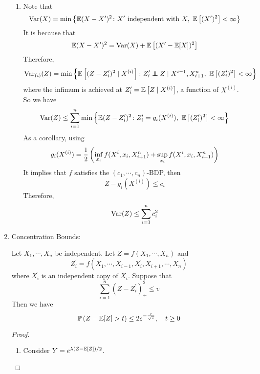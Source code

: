 \begin{enumerate}[label=\arabic{*}.]
\begin{enumerate}[label=(\roman*)]
		\item Note that
		\begin{equation*}
		    \operatorname{Var}(X) = \min \left\{\mathbb{E}(X-X^\prime)^2 \colon X^\prime \text{ independent with }X,~\mathbb{E}\left[(X^\prime)^2\right] < \infty\right\}
		\end{equation*}
		It is because that 
		\begin{equation*}
		    \mathbb{E}(X-X^\prime)^2 = \operatorname{Var}(X) + \mathbb{E}\left[(X^\prime - \mathbb{E}[X])^2\right]
		\end{equation*}
		Therefore,
		\begin{equation*}
		    \op{Var}_{(i)}(Z) = \min\bb{\E\bj{(Z-Z_i^\prime)^2 \mid X^{(i)}} \colon Z_i^\prime \independent Z \mid X^{i-1},X_{i+1}^n,~\E\bj{(Z_i^\prime)^2} < \infty}
		\end{equation*}
		where the infimum is achieved at $Z_i^\prime = \mathbb{E}\left[Z \mid X^{(i)}\right]$, a function of $X^{(i)}$. So we have
		\begin{equation*}
		    \operatorname{Var}(Z) \leq \sum_{i=1}^n \min\left\{\mathbb{E}(Z-Z_i^\prime)^2 \colon Z_i^\prime = g_i(X^{(i)}),~\mathbb{E}\left[(Z_i^\prime)^2\right] < \infty\right\} 
		\end{equation*}
		As a corollary, using
		\begin{equation*}
		    g_i(X^{(i)}) = \frac{1}{2}\left(\inf_{x_i} f(X^i,x_i,X_{i+1}^n)+\sup_{x_i} f(X^i,x_i,X_{i+1}^n)\right)
		\end{equation*}
		It implies that $f$ satisfies the $(c_1,\cdots,c_n)$-BDP, then
		\begin{equation*}
		    Z-g_i(X^{(i)}) \leq c_i
		\end{equation*}
		Therefore,
		\begin{equation*}
		    \operatorname{Var}(Z) \leq \sum_{i=1}^n c_i^2
		\end{equation*} 
	\end{enumerate}
	
	\item Concentration Bounds: 
	\begin{thm}
	    Let $X_1,\cdots,X_n$ be independent. Let $Z = f(X_1,\cdots,X_n)$ and
	    \begin{equation*}
	        Z_i^\prime = f(X_1,\cdots,X_{i-1},X_i^\prime,X_{i+1},\cdots,X_n)
	    \end{equation*}
	    where $X_i^\prime$ is an independent copy of $X_i$. Suppose that
	    \begin{equation*}
	        \sum_{i=1}^n (Z-Z_i^\prime)^2_+ \leq v
	    \end{equation*}
	    Then we have
	    \begin{equation*}
	        \mathbb{P}\left(Z - \mathbb{E}[Z] > t\right) \leq 2e^{-\frac{t}{\sqrt{v}}},\quad t \geq 0
	    \end{equation*}
	\end{thm}
	\begin{proof}
		\begin{enumerate}[label=\Roman*.]
			\item Consider $Y = e^{\lambda(Z - \mathbb{E}[Z]) /2}$.


\end{enumerate}
\end{proof}
\end{enumerate}
